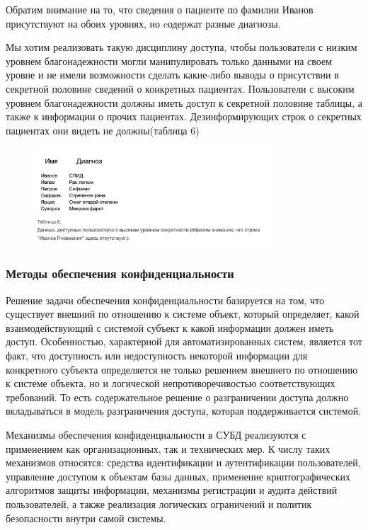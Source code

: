 Обратим внимание на то, что сведения о пациенте по фамилии Иванов присутствуют на обоих уровнях,
но cодержат разные диагнозы.

Мы хотим реализовать такую дисциплину доступа, чтобы пользователи с низким уровнем благонадежности
могли манипулировать только данными на своем уровне и не имели возможности сделать какие-либо
выводы о присутствии в секретной половине сведений о конкретных пациентах. Пользователи с высоким
уровнем благонадежности должны иметь доступ к секретной половине таблицы, а также к информации о
прочих пациентах. Дезинформирующих строк о секретных пациентах они видеть не должны(таблица 6)

\begin{figure}[h]
    \centering
    \includegraphics[width=0.8\textwidth]{assets/diagnoses3.png}
\end{figure}

\subsubsection{Методы обеспечения конфиденциальности}

Решение задачи обеспечения конфиденциальности базируется на том, что существует внешний по отношению к системе объект, который определяет, какой взаимодействующий с системой субъект к какой информации должен иметь доступ. Особенностью, характерной для автоматизированных систем, является тот факт, что доступность или недоступность некоторой информации для конкретного субъекта определяется не только решением внешнего по отношению к системе объекта, но и логической непротиворечивостью соответствующих требований. То есть содержательное решение о разграничении доступа должно вкладываться в модель разграничения доступа, которая поддерживается системой.\cite{Smirnov2007}

Механизмы обеспечения конфиденциальности в СУБД реализуются с применением как организационных, так и технических мер. К числу таких механизмов относятся: средства идентификации и аутентификации пользователей, управление доступом к объектам базы данных, применение криптографических алгоритмов защиты информации, механизмы регистрации и аудита действий пользователей, а также реализация логических ограничений и политик безопасности внутри самой системы.\cite{Smirnov2007}

